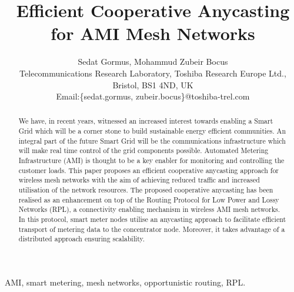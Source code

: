 \documentclass[conference]{IEEEtran}
\begin{document}
\title{Efficient Cooperative Anycasting for AMI Mesh Networks}





\author{Sedat Gormus, Mohammud Zubeir Bocus \\
        Telecommunications Research Laboratory, Toshiba Research Europe Ltd.,\\
Bristol, BS1 4ND, UK\\
Email:\{sedat.gormus, zubeir.bocus\}@toshiba-trel.com}





















\maketitle
\thispagestyle{empty}
\pagestyle{empty}

\begin{abstract}
We have, in recent years, witnessed an increased interest towards enabling a Smart
Grid which will be a corner stone to build sustainable energy efficient communities. 
An integral part of the  future Smart Grid will be the communications infrastructure
which will make real time control of the grid components possible. Automated Metering
Infrastructure (AMI) is thought to be a key enabler for monitoring and controlling the customer loads. 
This paper proposes an efficient cooperative anycasting approach for wireless mesh networks with the aim of achieving reduced traffic and increased utilisation of the network resources. The proposed cooperative anycasting has been realised as an enhancement on top of the Routing Protocol for Low Power and Lossy
Networks (RPL), a connectivity enabling mechanism in wireless AMI mesh networks. In this protocol, smart meter nodes utilise  an anycasting approach to facilitate efficient transport of metering data to the
concentrator node. Moreover, it takes advantage of a distributed approach ensuring scalability.
\end{abstract}


\begin{IEEEkeywords}
AMI, smart metering, mesh networks, opportunistic routing, RPL.
\end{IEEEkeywords}
\end{document}

